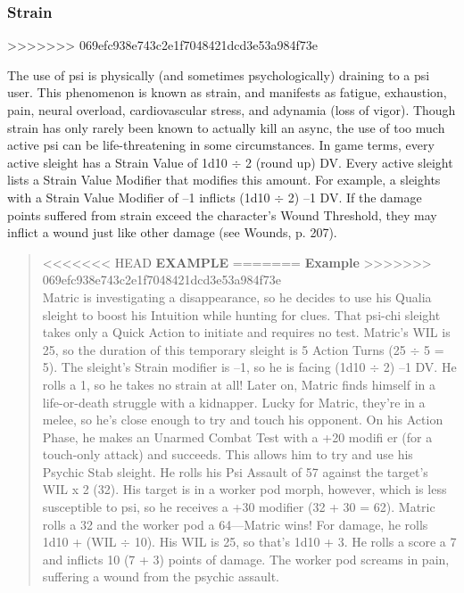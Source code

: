 \subsubsection{Strain}
>>>>>>> 069efc938e743c2e1f7048421dcd3e53a984f73e

The use of psi is physically (and sometimes psychologically)
draining to a psi user. This phenomenon is
known as strain, and manifests as fatigue, exhaustion,
pain, neural overload, cardiovascular stress, and
adynamia (loss of vigor). Though strain has only
rarely been known to actually kill an async, the use
of too much active psi can be life-threatening in some
circumstances.
In game terms, every active sleight has a Strain
Value of 1d10 $\div$ 2 (round up) DV. Every active sleight
lists a Strain Value Modifier that modifies this amount.
For example, a sleights with a Strain Value Modifier
of –1 inflicts (1d10 $\div$ 2) –1 DV.
If the damage points suffered from strain exceed
the character’s Wound Threshold, they may inflict a
wound just like other damage (see Wounds, p. 207).

\begin{quotation}
<<<<<<< HEAD
\textbf{EXAMPLE}
=======
\textbf{Example}
>>>>>>> 069efc938e743c2e1f7048421dcd3e53a984f73e
\\
Matric is investigating a disappearance, so he
decides to use his Qualia sleight to boost his
Intuition while hunting for clues. That psi-chi
sleight takes only a Quick Action to initiate and
requires no test. Matric’s WIL is 25, so the duration
of this temporary sleight is 5 Action Turns
(25 $\div$ 5 = 5). The sleight’s Strain modifier is –1,
so he is facing (1d10 $\div$ 2) –1 DV. He rolls a 1, so
he takes no strain at all!
Later on, Matric finds himself in a life-or-death
struggle with a kidnapper. Lucky for Matric,
they’re in a melee, so he’s close enough to try
and touch his opponent. On his Action Phase, he
makes an Unarmed Combat Test with a +20 modifi
er (for a touch-only attack) and succeeds. This
allows him to try and use his Psychic Stab sleight.
He rolls his Psi Assault of 57 against the target’s
WIL x 2 (32). His target is in a worker pod morph,
however, which is less susceptible to psi, so he
receives a +30 modifier (32 + 30 = 62). Matric
rolls a 32 and the worker pod a 64—Matric wins!
For damage, he rolls 1d10 + (WIL $\div$ 10). His WIL
is 25, so that’s 1d10 + 3. He rolls a score a 7 and
inflicts 10 (7 + 3) points of damage. The worker
pod screams in pain, suffering a wound from the
psychic assault.

\end{quotation}



